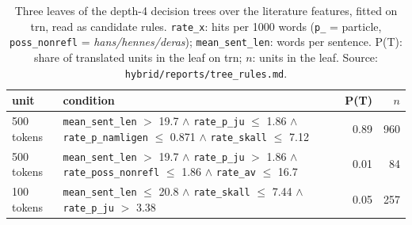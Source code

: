 \begin{table}[tbp]
\centering\footnotesize
\caption{Three leaves of the depth-4 decision trees over the literature features, fitted on trn,
read as candidate rules. \texttt{rate\_x}: hits per 1000 words (\texttt{p\_} = particle,
\texttt{poss\_nonrefl} = \emph{hans/hennes/deras}); \texttt{mean\_sent\_len}: words per sentence.
P(T): share of translated units in the leaf on trn; $n$: units in the leaf.
Source: \texttt{hybrid/reports/tree\_rules.md}.}
\label{tab-trees}
\begin{tabularx}{\textwidth}{@{}l X r r@{}}
\toprule
unit & condition & P(T) & $n$ \\
\midrule
500 tokens & \texttt{mean\_sent\_len} $>$ 19.7 $\wedge$ \texttt{rate\_p\_ju} $\le$ 1.86 $\wedge$ \texttt{rate\_p\_namligen} $\le$ 0.871 $\wedge$ \texttt{rate\_skall} $\le$ 7.12 & 0.89 & 960 \\
500 tokens & \texttt{mean\_sent\_len} $>$ 19.7 $\wedge$ \texttt{rate\_p\_ju} $>$ 1.86 $\wedge$ \texttt{rate\_poss\_nonrefl} $\le$ 1.86 $\wedge$ \texttt{rate\_av} $\le$ 16.7 & 0.01 & 84 \\
100 tokens & \texttt{mean\_sent\_len} $\le$ 20.8 $\wedge$ \texttt{rate\_skall} $\le$ 7.44 $\wedge$ \texttt{rate\_p\_ju} $>$ 3.38 & 0.05 & 257 \\
\bottomrule
\end{tabularx}
\end{table}
